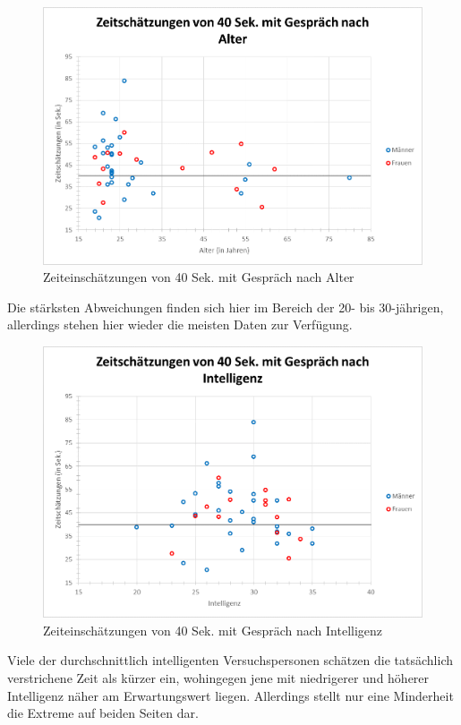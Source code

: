 \documentclass{Paper}
\begin{document}
\begin{figure}[H]
	\centering
	\includegraphics[scale=0.7]{../Diagramme/scatterPre/40mit_alter.png}
	\caption{Zeiteinschätzungen von 40 Sek. mit Gespräch nach Alter}
	\label{img:alter40mit}
\end{figure}

Die stärksten Abweichungen finden sich hier im Bereich der 20- bis 30-jährigen, allerdings stehen hier wieder die meisten Daten zur Verfügung. 


\begin{figure}[H]
	\centering
	\includegraphics[scale=0.7]{../Diagramme/scatterPre/40mit_intelligenz.png}
	\caption{Zeiteinschätzungen von 40 Sek. mit Gespräch nach Intelligenz}
	\label{img:intell40mit}
\end{figure}

Viele der durchschnittlich intelligenten Versuchspersonen schätzen die tatsächlich verstrichene Zeit als kürzer ein, wohingegen jene mit niedrigerer und höherer Intelligenz näher am Erwartungswert liegen. Allerdings stellt nur eine Minderheit die Extreme auf beiden Seiten dar.
\end{document}
